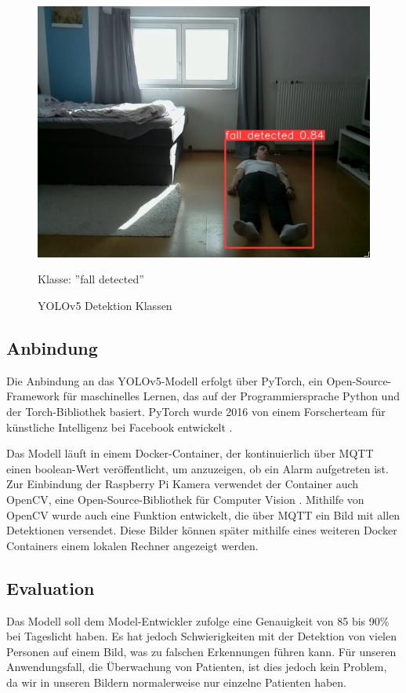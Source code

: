 \begin{figure}[H]
\begin{minipage}[b]{0.3\textwidth}
		\includegraphics[width=\textwidth]{images/fallen.png}
		\caption*{Klasse: ''fall detected''}
	\end{minipage}
	\caption{YOLOv5 Detektion Klassen}
	\label{fig:yolo_classes}
\end{figure}



\subsection{Anbindung}
Die Anbindung an das YOLOv5-Modell erfolgt über PyTorch, ein Open-Source-Framework für maschinelles Lernen, das auf der Programmiersprache Python und der Torch-Bibliothek basiert. PyTorch wurde 2016 von einem Forscherteam für künstliche Intelligenz bei Facebook entwickelt \cite{noauthor_pytorch_nodate}.

Das Modell läuft in einem Docker-Container, der kontinuierlich über MQTT einen boolean-Wert veröffentlicht, um anzuzeigen, ob ein Alarm aufgetreten ist. Zur Einbindung der Raspberry Pi Kamera verwendet der Container auch OpenCV, eine Open-Source-Bibliothek für Computer Vision \cite{OpenCV}. Mithilfe von OpenCV wurde auch eine Funktion entwickelt, die über MQTT ein Bild mit allen Detektionen versendet. Diese Bilder können später mithilfe eines weiteren Docker Containers   einem lokalen Rechner angezeigt werden.


\subsection{Evaluation}
Das Modell soll dem Model-Entwickler zufolge eine Genauigkeit von 85 bis 90\% bei Tageslicht haben. Es hat jedoch Schwierigkeiten mit der Detektion von vielen Personen auf einem Bild, was zu falschen Erkennungen führen kann. Für unseren Anwendungsfall, die Überwachung von Patienten, ist dies jedoch kein Problem, da wir in unseren Bildern normalerweise nur einzelne Patienten haben. 


